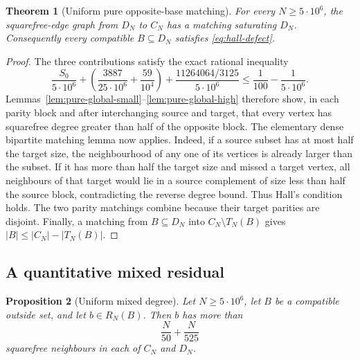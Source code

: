 \documentclass[11pt]{article}
\newtheorem{theorem}{Theorem}[section]
\newtheorem{proposition}[theorem]{Proposition}
\theoremstyle{definition}
\newcommand{\CN}{C_N}
\newcommand{\DN}{D_N}
\newcommand{\TN}{T_N}
\newcommand{\RN}{R_N}
\newcommand{\FiveMillion}{5\cdot10^6}
\begin{document}
\begin{theorem}[Uniform pure opposite-base matching]
\label{thm:pure-parity-matching}
For every $N\geq\FiveMillion$, the squarefree-edge graph from $\DN$ to
$\CN$ has a matching saturating $\DN$.  Consequently every compatible
$B\subseteq\DN$ satisfies \eqref{eq:hall-defect}.
\end{theorem}

\begin{proof}
 The three contributions satisfy the exact rational inequality
\begin{equation}\label{eq:pure-envelope}
 \frac{S_0}{\FiveMillion}
 +\left(\frac{3887}{25\cdot10^6}+\frac{59}{10^4}\right)
 +\frac{11264064/3125}{\FiveMillion}
 \leq\frac1{100}-\frac1{\FiveMillion}.
\end{equation}
Lemmas~\ref{lem:pure-global-small}--\ref{lem:pure-global-high} therefore
show, in each parity block and after interchanging source and target, that
every vertex has squarefree degree greater than half of the opposite block.
The elementary dense bipartite matching lemma now applies.  Indeed, if a
source subset has at most half the target size, the neighbourhood of any one
of its vertices is already larger than the subset.  If it has more than half
the target size and missed a target vertex, all neighbours of that target
would lie in a source complement of size less than half the source block,
contradicting the reverse degree bound.  Thus Hall's condition holds.  The two
parity matchings combine
because their target parities are disjoint.  Finally, a matching from
$B\subseteq\DN$ into $\CN\setminus\TN(B)$ gives
$|B|\leq|\CN|-|\TN(B)|$.
\end{proof}

\subsection{A quantitative mixed residual}

\begin{proposition}[Uniform mixed degree]\label{prop:uniform-mixed-degree}
Let $N\geq\FiveMillion$, let $B$ be a compatible outside set, and let
$b\in\RN(B)$.  Then $b$ has more than
\[
  \frac N{50}+\frac N{525}
\]
squarefree neighbours in each of $\CN$ and $\DN$.
\end{proposition}
\end{document}
